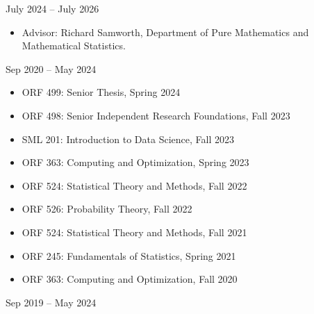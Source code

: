 \documentclass{wgu-cv}
\begin{document}
\maketitle


{July 2024 -- July 2026}

\begin{itemize}
  \item Advisor:
    Richard Samworth, Department of Pure Mathematics
    and Mathematical Statistics.
\end{itemize}

{Sep 2020 -- May 2024}

\begin{itemize}

  \item
    ORF 499:
    Senior Thesis,
    Spring 2024

  \item
    ORF 498:
    Senior Independent Research Foundations,
    Fall 2023

  \item
    SML 201:
    Introduction to Data Science,
    Fall 2023

  \item
    ORF 363:
    Computing and Optimization,
    Spring 2023

  \item
    ORF 524:
    Statistical Theory and Methods,
    Fall 2022

  \item
    ORF 526:
    Probability Theory,
    Fall 2022

  \item
    ORF 524:
    Statistical Theory and Methods,
    Fall 2021

  \item
    ORF 245:
    Fundamentals of Statistics,
    Spring 2021

  \item
    ORF 363:
    Computing and Optimization,
    Fall 2020

\end{itemize}

\vspace*{1mm}


{Sep 2019 -- May 2024}
\end{document}
